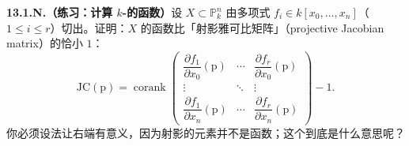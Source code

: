 \textbf{13.1.N.（练习：计算\trProjective{} $k$-\trScheme{}的\trJacobianMatrix{}\trCorank{}函数）}\quad 设 $X\subset\mathbb{P}^n_k$ 由\trHomogeneous{}多项式 $f_i\in k[x_0,\dots,x_n]$（$1\le i\le r$）切出。证明：$X$ 的\trJacobianMatrix{}\trCorank{}函数比「射影雅可比矩阵」（projective Jacobian matrix）的\trCorank{}恰小 $1$：
\begin{equation*}\tag{13.1.9.1}\label{eq:projective-jacobian-corank}
\mathrm{JC}(\mathrm{p})=\operatorname{corank}
\begin{pmatrix}
\dfrac{\partial f_1}{\partial x_0}(\mathrm{p}) & \cdots & \dfrac{\partial f_r}{\partial x_0}(\mathrm{p})\\
\vdots & \ddots & \vdots\\
\dfrac{\partial f_1}{\partial x_n}(\mathrm{p}) & \cdots & \dfrac{\partial f_r}{\partial x_n}(\mathrm{p})
\end{pmatrix}-1.
\end{equation*}
你必须设法让右端有意义，因为射影\trJacobianMatrix{}的元素并不是函数；这个\trCorank{}到底是什么意思呢？
